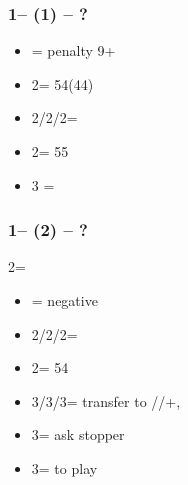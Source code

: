 \documentclass[12pt, a4paper]{article}
\begin{document}
\subsubsection*{1\clubs -- (1\nt) -- ?}
\begin{itemize}
    \item \dbl = penalty 9+
    \item 2\clubs = 54\major (44)
    \item 2\diams/2\hearts/2\spades = \nf
    \item 2\nt = 55\minor
    \item 3 = \inv \unbal
\end{itemize}

\subsubsection*{1\clubs -- (2\clubs) -- ?}
2\clubs = \clubs
\begin{itemize}
    \item \dbl = negative
    \item 2\diams/2\hearts/2\spades = \nf
    \item 2\nt = 54\major \gf
    \item 3\clubs/3\diams/3\hearts = transfer to \diams/\hearts/+, \invp
    \item 3\spades = ask \clubs stopper
    \item 3\nt = to play
\end{itemize}

\end{document}

